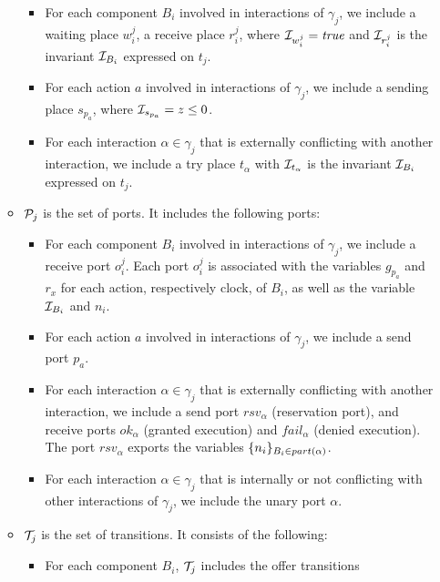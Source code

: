 \begin{definition}[Scheduler]
\begin{itemize}
\begin{itemize}
        \begin{itemize}
          \item For each component $B_i$ involved in interactions of $\gamma_j$, we include
            a waiting place $w_i^j$, a receive place $r_i^j$, where $\mathcal{I}_{w_i^j}=\textnormal{\textit{true}}$
            and $\mathcal{I}_{r_i^j}$ is the invariant $\mathcal{I}_{B_i}$ expressed on $t_j$.
          \item For each action $a$ involved in interactions of $\gamma_j$, we include a sending
            place $s_{p_a}$, where $\mathcal{I}_{s_{p_a}}=z\le0$.
          \item For each interaction $\alpha\in\gamma_j$ that is externally conflicting 
            with another interaction, we include a try place $t_{\alpha}$ with 
            $\mathcal{I}_{t_{\alpha}}$ is the invariant $\mathcal{I}_{B_i}$ expressed on $t_j$.
        \end{itemize}
        \item $\mathcal{P}_j$ is the set of ports. It includes the following ports:
          \begin{itemize}
            \item For each component $B_i$ involved in interactions of $\gamma_j$, we include
              a receive port $o_i^j$. Each port $o_i^j$ is associated with the variables
              $g_{p_a}$ and $r_x$ for each action, respectively clock, of $B_i$, as well
              as the variable $\mathcal{I}_{B_i}$ and $n_i$.
            \item For each action $a$ involved in interactions of $\gamma_j$, we include 
              a send port $p_a$.
            \item For each interaction $\alpha\in\gamma_j$ that is externally conflicting with
              another interaction, we include a send port $rsv_{\alpha}$ (reservation port), 
              and receive ports $ok_{\alpha}$ (granted execution) and $fail_{\alpha}$ (denied 
              execution). The port $rsv_{\alpha}$ exports the variables $\{n_i\}_{B_i
              \in part(\alpha)}$.
            \item For each interaction $\alpha\in\gamma_j$ that is internally or not conflicting
              with other interactions of $\gamma_j$, we include the unary port $\alpha$.
          \end{itemize}
        \item $\mathcal{T}_j$ is the set of transitions. It consists of the following:
          \begin{itemize}
            \item For each component $B_i$, $\mathcal{T}_j$ includes the offer transitions 

\end{itemize}
\end{itemize}
\end{itemize}
\end{definition}
